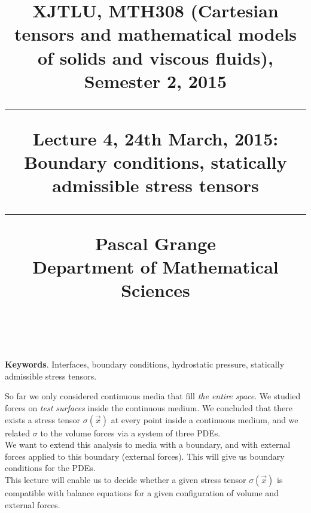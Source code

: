\documentclass[DIV=12]{article}
\begin{document}
\title{
\noindent\hrulefill
\begin{flushleft}
{\Large \bf{XJTLU, MTH308 (Cartesian tensors and mathematical models of solids and viscous fluids), Semester 2, 2015\\
\vspace{8mm}
\hrule
\vspace{6mm}
 Lecture 4, 24th March, 2015: Boundary conditions, statically admissible stress tensors}}
\vspace{8mm}
\hrule
\vspace{6mm}
{\Large{Pascal Grange\\
Department of Mathematical Sciences\\
{}\\
}}
\noindent\hrulefill
\end{flushleft}}
\date{}
\author{}
\maketitle
\vspace{-3mm}

{\bf{Keywords}}. Interfaces, boundary conditions, hydrostatic pressure, statically admissible stress tensors.\\
\vspace{3mm}

\tableofcontents
 
\vspace{12mm}


So far we only considered continuous media that fill {\emph{the entire space}}. We studied 
 forces on {\emph{test surfaces}} inside the continuous medium. We concluded that there 
 exists a stress tensor $\sigma(\vec{x})$ at every point inside a continuous medium, and we related 
 $\sigma$ to the volume forces via a system of three PDEs.\\


We want to extend this analysis 
 to media with a boundary, and with external forces applied to this boundary (external forces). 
 This will give us boundary conditions for the PDEs.\\

 This lecture will enable us to decide whether a given stress tensor $\sigma(\vec{x})$ is 
 compatible with balance equations for a given configuration of volume and external forces.\\
\end{document}
